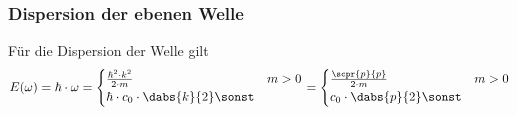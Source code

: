 \documentclass{article}
\begin{document}
        \subsubsection*{Dispersion der ebenen Welle}
        Für die Dispersion der Welle gilt 
        \[E(\omega) = \hbar\cdot\omega = \begin{cases}
            \frac{\hbar^2\cdot k^2}{2\cdot m} & m>0 \\
            \hbar\cdot c_0\cdot \dabs{k}{2} \sonst
        \end{cases} = \begin{cases}
            \frac{\scpr{p}{p}}{2\cdot m} & m>0 \\
            c_0\cdot\dabs{p}{2} \sonst
        \end{cases}\]
\end{document}
